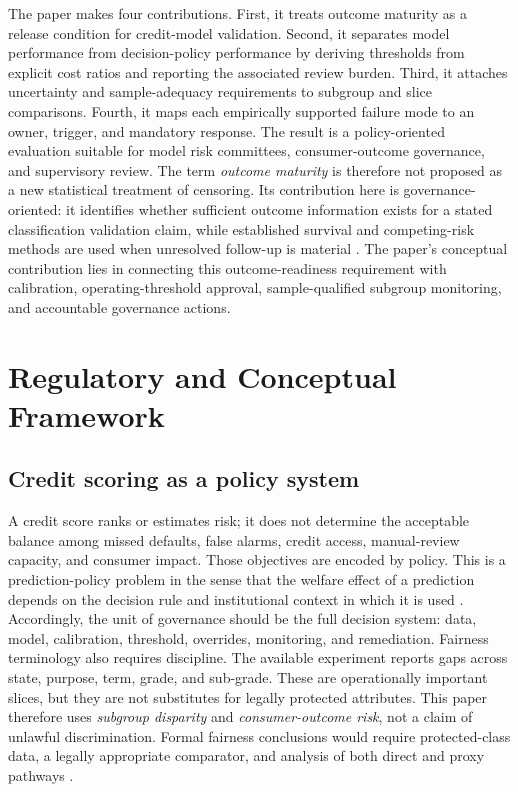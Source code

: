 \documentclass[10pt]{article}
\begin{document}
The paper makes four contributions. First, it treats outcome maturity as a release condition for credit-model validation. Second, it separates model performance from decision-policy performance by deriving thresholds from explicit cost ratios and reporting the associated review burden. Third, it attaches uncertainty and sample-adequacy requirements to subgroup and slice comparisons. Fourth, it maps each empirically supported failure mode to an owner, trigger, and mandatory response. The result is a policy-oriented evaluation suitable for model risk committees, consumer-outcome governance, and supervisory review. The term \emph{outcome maturity} is therefore not proposed as a new statistical treatment of censoring. Its contribution here is governance-oriented: it identifies whether sufficient outcome information exists for a stated classification validation claim, while established survival and competing-risk methods are used when unresolved follow-up is material \cite{ref49,ref50,ref51,ref52}. The paper's conceptual contribution lies in connecting this outcome-readiness requirement with calibration, operating-threshold approval, sample-qualified subgroup monitoring, and accountable governance actions.

\section{Regulatory and Conceptual Framework}

\subsection{Credit scoring as a policy system}

A credit score ranks or estimates risk; it does not determine the acceptable balance among missed defaults, false alarms, credit access, manual-review capacity, and consumer impact. Those objectives are encoded by policy. This is a prediction-policy problem in the sense that the welfare effect of a prediction depends on the decision rule and institutional context in which it is used \cite{ref18}. Accordingly, the unit of governance should be the full decision system: data, model, calibration, threshold, overrides, monitoring, and remediation. Fairness terminology also requires discipline. The available experiment reports gaps across state, purpose, term, grade, and sub-grade. These are operationally important slices, but they are not substitutes for legally protected attributes. This paper therefore uses \emph{subgroup disparity} and \emph{consumer-outcome risk}, not a claim of unlawful discrimination. Formal fairness conclusions would require protected-class data, a legally appropriate comparator, and analysis of both direct and proxy pathways \cite{ref8,ref19}.
\end{document}

